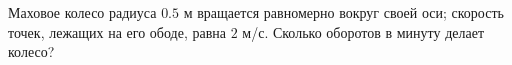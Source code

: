 Маховое колесо радиуса $0.5$ м вращается равномерно вокруг своей оси;
скорость точек, лежащих на его ободе, равна $2$ м/с. Сколько оборотов
в минуту делает колесо?
